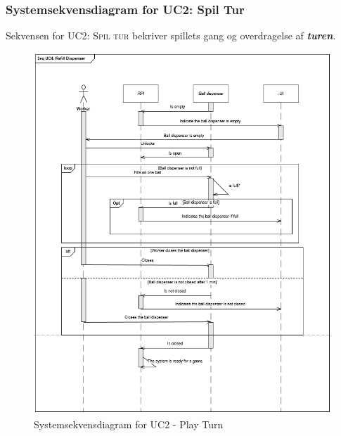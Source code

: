 \documentclass[Rapport/Rapport_main.tex]{subfiles}
\begin{document}
\subsubsection{Systemsekvensdiagram for UC2: Spil Tur}
Sekvensen for \textsc{UC2: Spil tur} bekriver spillets gang og overdragelse af \textit{\textbf{turen}}.
\begin{figure}
    \centering 
    \includegraphics[scale=0.85]{Arkitektur/Sekvensdiagrammer/graphics/sd_UC2.png}
    \caption{Systemsekvensdiagram for UC2 - Play Turn}
    \label{fig:rap_sd_UC2}
\end{figure}
\end{document}
